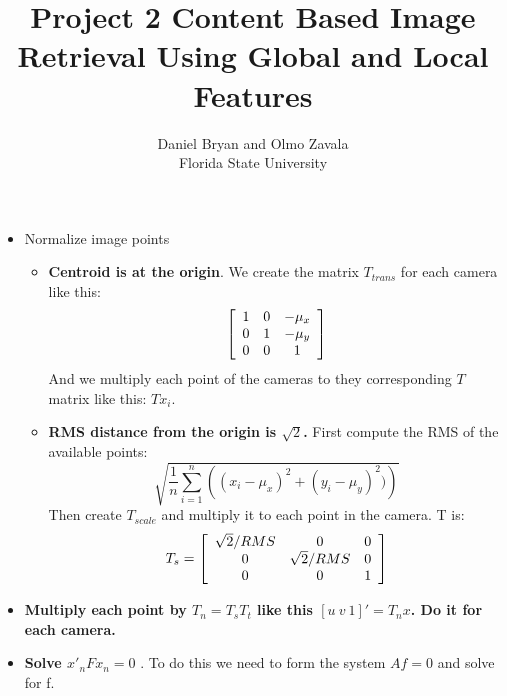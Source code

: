 \documentclass[a4paper,12pt]{article}
\title{Project 2 Content Based Image Retrieval Using Global and Local Features}
\author{Daniel Bryan and Olmo Zavala\\Florida State University}
\begin{document}
\maketitle

\begin{itemize}
    \item Normalize image points
        \begin{itemize}
            \item \textbf{Centroid is at the origin}. We create the matrix $T_{trans}$ for each
                camera like this:
                \begin{equation}
                    \left [
                    \begin{array}[ ]{c c c}
                        1 & 0 & -\mu_x\\
                        0 & 1 & -\mu_y\\
                        0 & 0 & 1\\
                    \end{array}
                \right ]
                \end{equation}
                And we multiply each point of the cameras to they corresponding $T$ matrix like this:
                $Tx_i$.
            \item \textbf{RMS distance from the origin is $\sqrt{2}$.} First compute the RMS of the
                available points:
                \begin{equation}
                    \sqrt{ \frac{1}{n} \sum_{i=1}^n \left(  (x_i - \mu_x)^2 + (y_i- \mu_y)^2) \right) }
                \end{equation}
                Then create $T_{scale}$ and multiply it to each point in the camera. T is:
                \begin{equation}
                    T_s = \left[ 
                    \begin{array}[]{ccc}
                        \sqrt{2}/RMS & 0 & 0 \\
                        0 & \sqrt{2}/RMS  & 0 \\
                        0 & 0 & 1 
                    \end{array}
                     \right]
                \end{equation}
        \end{itemize}
    \item \textbf{Multiply each point by $T_n = T_sT_t$ like this $[u~ v~ 1]' = T_nx$. Do it for each camera.}
    \item \textbf{Solve $x'_nFx_n = 0$ }. To do this we need to form the system $Af = 0$ and solve for f.

\end{itemize}
\end{document}

